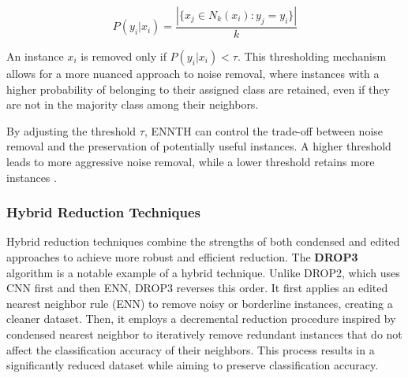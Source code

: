 \begin{equation}
P(y_i | x_i) = \frac{|\{x_j \in N_k(x_i) : y_j = y_i\}|}{k}
\end{equation}

An instance $x_i$ is removed only if $P(y_i | x_i) < \tau$. This thresholding mechanism allows for a more nuanced approach to noise removal, where instances with a higher probability of belonging to their assigned class are retained, even if they are not in the majority class among their neighbors.

By adjusting the threshold $\tau$, ENNTH can control the trade-off between noise removal and the preservation 
of potentially useful instances. A higher threshold leads to more aggressive noise removal, while a lower threshold 
retains more instances \cite{ENNTH}.



\subsubsection*{Hybrid Reduction Techniques}

Hybrid reduction techniques combine the strengths of both condensed and edited approaches to 
achieve more robust and efficient reduction. The \textbf{DROP3} algorithm \cite{Wilson2000} 
is a notable example of a hybrid technique. Unlike DROP2, which uses CNN first and then ENN, DROP3 reverses this order. 
It first applies an edited nearest neighbor rule (ENN) to remove noisy or borderline instances, creating a cleaner dataset.
Then, it employs a decremental reduction procedure inspired by condensed nearest neighbor to iteratively remove redundant
instances that do not affect the classification accuracy of their neighbors. This process results in a significantly 
reduced dataset while aiming to preserve classification accuracy.

